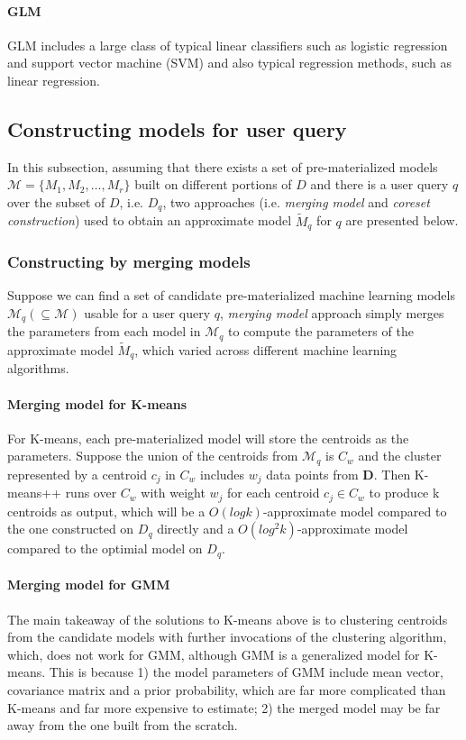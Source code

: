 \paragraph{GLM} GLM includes a large class of typical linear classifiers such as logistic regression and support vector machine (SVM) and also typical regression methods, such as linear regression.

\subsection{Constructing models for user query}
In this subsection, assuming that there exists a set of pre-materialized models $\mathcal{M} = \{M_1, M_2, \dots, M_r\}$ built on different portions of $D$ and there is a user query $q$ over the subset of $D$, i.e. $D_q$, two approaches (i.e. {\em merging model} and {\em coreset construction}) used to obtain an approximate model $\tilde{M}_q$ for $q$ are presented below. 

\subsubsection{Constructing by merging models}
Suppose we can find a set of candidate pre-materialized machine learning models $\mathcal{M}_q (\subseteq \mathcal{M})$ usable for a user query $q$, {\em merging model} approach simply merges the parameters from each model in $\mathcal{M}_q$ to compute the parameters of the approximate model $\tilde{M}_q$, which varied across different machine learning algorithms.

\paragraph{Merging model for K-means}
For K-means, each pre-materialized model will store the centroids as the parameters. Suppose the union of the centroids from $\mathcal{M}_q$ is $C_w$ and the cluster represented by a centroid $c_j$ in $C_w$ includes $w_j$ data points from $\textbf{D}$. Then K-means++ \cite{arthur2007k} runs over $C_w$ with weight $w_j$ for each centroid $c_j \in C_w$ to produce k centroids as output, which will be a $O(log k)$-approximate model compared to the one constructed on $D_q$ directly and a $O(log^2k)$-approximate model compared to the optimial model on $D_q$.

\paragraph{Merging model for GMM}
The main takeaway of the solutions to K-means above is to clustering centroids from the candidate models with further invocations of the clustering algorithm, which, does not work for GMM, although GMM is a generalized model for K-means. This is because 1) the model parameters of GMM include mean vector, covariance matrix and a prior probability, which are far more complicated than K-means and far more expensive to estimate; 2) the merged model may be far away from the one built from the scratch. 

